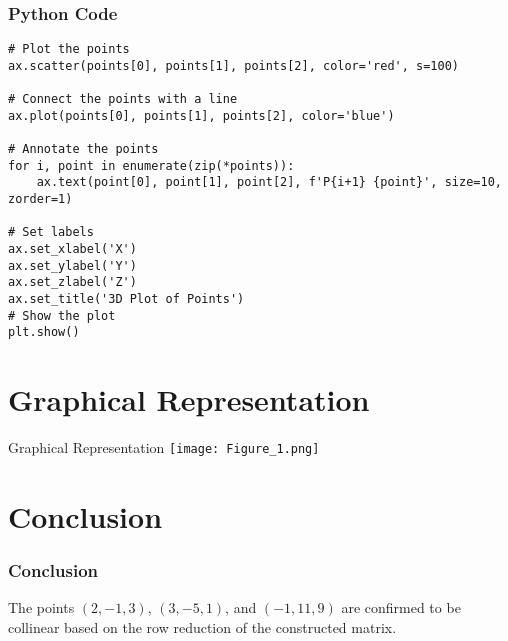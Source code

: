 \documentclass{beamer}
\providecommand{\brak}[1]{\ensuremath{\left(#1\right)}}
\theoremstyle{remark}
\numberwithin{equation}{section}
\begin{document}
\begin{frame}[fragile]
\frametitle{Python Code}
\begin{verbatim}
# Plot the points
ax.scatter(points[0], points[1], points[2], color='red', s=100)

# Connect the points with a line
ax.plot(points[0], points[1], points[2], color='blue')

# Annotate the points
for i, point in enumerate(zip(*points)):
    ax.text(point[0], point[1], point[2], f'P{i+1} {point}', size=10, zorder=1)

# Set labels
ax.set_xlabel('X')
ax.set_ylabel('Y')
ax.set_zlabel('Z')
ax.set_title('3D Plot of Points')
# Show the plot
plt.show()
\end{verbatim}
\end{frame}


\section{Graphical Representation}
\begin{frame}{Graphical Representation}
\texttt{[image: Figure\_1.png]}

\end{frame}
\section{Conclusion}
\begin{frame}
\frametitle{Conclusion}
The points \(\brak{2,-1,3}\), \(\brak{3,-5,1}\), and \(\brak{-1,11,9}\) are confirmed to be collinear based on the row reduction of the constructed matrix.
\end{frame}
\end{document}
